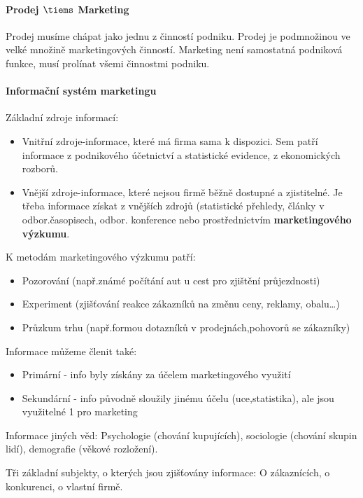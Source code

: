 \documentclass[11pt,a4paper,twoside]{book}
\begin{document}
	\paragraph*{Prodej $\tiems$ Marketing}
		Prodej musíme chápat jako jednu z činností podniku. Prodej je podmnožinou ve velké množině marketingových činností.
		Marketing není samostatná podniková funkce, musí prolínat všemi činnostmi podniku.

	\paragraph*{Informační systém marketingu}
		Základní zdroje informací:
		\begin{itemize}
			\item Vnitřní zdroje-informace, které má firma sama k dispozici. Sem patří informace z podnikového účetnictví a statistické evidence, z ekonomických rozborů.
			\item Vnější zdroje-informace, které nejsou firmě běžně dostupné a zjistitelné. Je třeba informace získat z vnějších zdrojů (statistické přehledy, články v odbor.časopisech, odbor. konference nebo prostřednictvím \textbf{marketingového výzkumu}.
		\end{itemize}

	K metodám marketingového výzkumu patří:
	\begin{itemize}
		\item Pozorování (např.známé počítání aut u cest pro zjištění průjezdnosti)
		\item Experiment (zjišťování reakce zákazníků na změnu ceny, reklamy, obalu\ldots)
		\item Průzkum trhu (např.formou dotazníků v prodejnách,pohovorů se zákazníky)
	\end{itemize}

	Informace můžeme členit také:
	\begin{itemize}
		\item Primární - info byly získány za účelem marketingového využití
		\item Sekundární - info původně sloužily jinému účelu (uce,statistika), ale jsou využitelné 1 pro marketing
	\end{itemize}

	Informace jiných věd:
	Psychologie (chování kupujících), sociologie (chování skupin lidí), demografie (věkové rozložení).

	Tři základní subjekty, o kterých jsou zjišťovány informace:
	O zákaznících, o konkurenci, o vlastní firmě.
	
\end{document}
